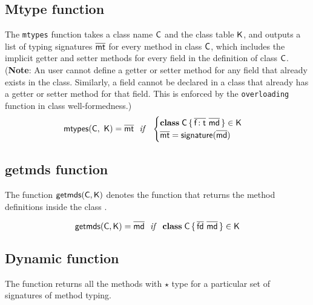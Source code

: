 \documentclass[acmlarge, anonymous, authordraft]{acmart}
\begin{document}
\subsection{Mtype function}

The \texttt{mtypes} function takes a class name $\C$ and the class table
$\K$, and outputs a list of typing signatures $\b\mt$ for every method in
class $\C$, which includes the implicit getter and setter methods for every
field in the definition of class $\C$.  (\textbf{Note}: An user cannot
define a getter or setter method for any field that already exists in the
class. Similarly, a field cannot be declared in a class that already has a
getter or setter method for that field. This is enforced by the
\texttt{overloading} function in class well-formedness.) \\

\begin{equation*}
\classoff\C\K = \b\mt ~~\mathit{if}~~ \begin{cases}

 \Class \C {\b{\Ftype\f\t}}{\b\md} \in \K\\
 \b\mt = \sign{\b\md} 

\end{cases}
\end{equation*}

\subsection{getmds function}

The function $\getmds\C\K$ denotes the function that returns the method definitions inside the class \C.

\begin{equation*}
\getmds\C\K = \b\md ~~\mathit{if}~~ \Class\C{\b{\fd}}{\b\md} \in \K
\end{equation*}

\subsection{Dynamic function}

The  function returns all the methods with $\star$ type for a particular set of 
signatures of method typing.

\begin{mathpar}

\end{mathpar}
\end{document}
